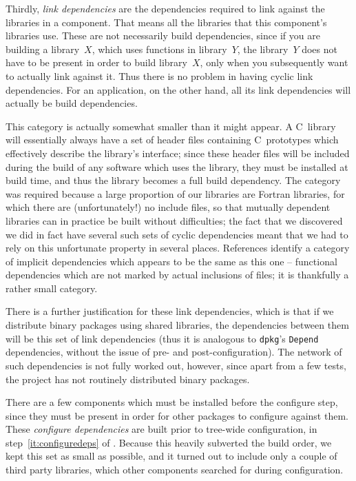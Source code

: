 \documentclass{speauth}
\begin{document}
Thirdly, \emph{link dependencies} are the dependencies required to
link against the libraries in a component. That means all the
libraries that this component's libraries use. These are not
necessarily build dependencies, since if you are building a
library~$X$, which uses functions in library~$Y$, the library~$Y$ does
not have to be present in order to build library~$X$, only when you
subsequently want to actually link against it.  Thus there is no
problem in having cyclic link dependencies.  For an application, on
the other hand, all its link dependencies will actually be build
dependencies.

This category is actually somewhat smaller than it might appear.  A
C~library will essentially always have a set of header files
containing C~prototypes which effectively describe the library's
interface; since these header files will be included during the
build of any software which uses the library, they must be
installed at build time, and thus the library becomes a full build
dependency.  The category was required because a large proportion of
our libraries are Fortran libraries, for which there are
(unfortunately!) no include files, so that mutually dependent
libraries can in practice be built without difficulties; the fact that
we discovered we did in fact have several such sets of cyclic
dependencies meant that we had to rely on this unfortunate property in
several places.  References \cite{tuura01,wilde91} identify a category
of implicit dependencies which appears to be the same as this one --
functional dependencies which are not marked by actual inclusions of
files; it is thankfully a rather small category.

There is a further justification for these link dependencies, which is
that if we distribute binary packages using shared libraries, the
dependencies between them will be this set of link dependencies (thus
it is analogous to \texttt{dpkg}'s \texttt{Depend} dependencies,
without the issue of pre- and post-configuration).  The network of
such dependencies is not fully worked out, however, since apart from a
few tests, the project has not routinely distributed binary packages.

There are a few components which must be installed before the configure
step, since they must be present in order for other packages to
configure against them.  These \emph{configure dependencies} are built
prior to tree-wide configuration, in step~\ref{it:configuredeps} of
.  Because this heavily subverted the build order,
we kept this set as small as possible, and it turned out to include
only a couple of third party libraries, which other components
searched for during configuration.
\end{document}
